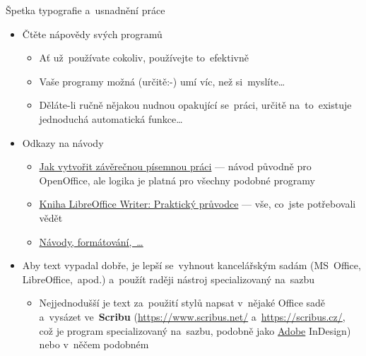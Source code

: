\documentclass[compress, ucs, xelatex, 11pt, xcolor=svgnames, aspectratio=169,
	hyperref={
		bookmarks=true,
		unicode=true,
		colorlinks=true,
		pdftitle={Citacni software},
		plainpages=false,
		pdfauthor={Vojtech Zeisek},
		pdfsubject={Kratky uvod do citacniho software},
		pdfcreator={XeLaTeX},
		pdfkeywords={citace, reference, software, literatura},
		linkcolor=Crimson, %
		anchorcolor=Magenta, %
		citecolor=Magenta, %
		filecolor=Magenta, %
		menucolor=Magenta, %
		urlcolor=DarkTurquoise, %
		pdftex},
	url={hyphens, lowtilde} %
	]{beamer}
\begin{document}
\begin{frame}[allowframebreaks]{Špetka typografie a~usnadnění práce}
\begin{itemize}
		\begin{itemize}
			\item \href{https://cs.wikipedia.org/wiki/Typografie}{Typografie} (grafická úprava textu) slouží k~tomu, aby~se~text dobře (pohodlně) četl (a~zároveň dobře vypadal)
			\item V~odborném textu sjednocuje styl psaní např. jednotek, odborných jmen \textit{kurzívou} apod., což~usnadňuje orientaci v~textu a~odstraňuje nejasnosti při čtení
			\item Pro angličtinu viz např. \href{https://authorservices.wiley.com/author-resources/book-authors/prepare-your-manuscript/house-style.html}{Wiley House Style}
		\end{itemize}
		\item Čtěte nápovědy svých programů
			\begin{itemize}
				\item Ať už~používate cokoliv, používejte to~efektivně
				\item Vaše programy možná (určitě:-) umí víc, než si~myslíte\ldots
				\item Děláte-li ručně nějakou nudnou opakující se~práci, určitě na~to~existuje jednoduchá automatická funkce\ldots
			\end{itemize}
		\item Odkazy na návody
			\begin{itemize}
				\item \href{https://www.linuxexpres.cz/kancelar/jak-vytvorit-zaverecnou-pisemnou-praci}{Jak vytvořit závěrečnou písemnou práci} --- návod původně pro OpenOffice, ale logika je platná pro všechny podobné programy
				\item \href{https://www.root.cz/knihy/libreoffice-writer-prakticky-pruvodce/}{Kniha LibreOffice Writer: Praktický průvodce} --- vše, co~jste potřebovali vědět
				\item \href{https://formatovani-dokumentu.cz/navody}{Návody, formátování,~\ldots}
			\end{itemize}
		\item Aby text vypadal dobře, je lepší se~vyhnout kancelářským sadám (MS~Office, LibreOffice,~apod.) a~použít raději nástroj specializovaný na~sazbu
			\begin{itemize}
				\item Nejjednodušší je text za~použití stylů napsat v~nějaké Office sadě a~vysázet ve~\textbf{Scribu} (\url{https://www.scribus.net/} a~\url{https://scribus.cz/}, což je program specializovaný na~sazbu, podobně jako \href{https://www.natur.cuni.cz/fakulta/cit/podpora-uzivatelu/softwarove-licence/adobe}{Adobe} InDesign) nebo v~něčem podobném
			\end{itemize}
	\end{itemize}
\end{frame}
\end{document}
